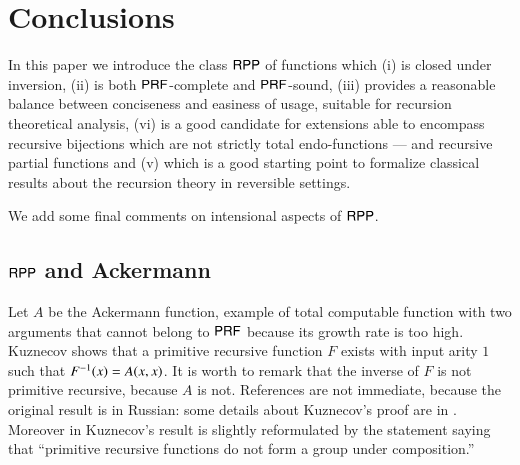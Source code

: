 \section{Conclusions}
\label{section:Some recursion theoretic side effects of RPP}

In this paper we introduce the class $\mathsf{RPP}$ of functions which
(i) is closed under inversion,
(ii) is both $ \mathsf{P}\mathsf{RF} $-complete and $ \mathsf{P}\mathsf{RF} $-sound,
(iii) provides a reasonable balance between conciseness and easiness of usage, suitable for recursion theoretical analysis,
(vi) is a good candidate for extensions able to encompass recursive bijections  which are not strictly total endo-functions 
--- and recursive partial functions	and 
(v) which is a good starting point to formalize classical results about the recursion theory in reversible settings.


We add some final comments on intensional aspects of $ \mathsf{RPP} $.

\subsection{$ \mathsf{RPP} $ and Ackermann}
Let $ A $ be the Ackermann function, example of total computable function with two arguments 
that cannot belong to $ \mathsf{P}\mathsf{RF} $ because its growth rate is too high. 
 Kuznecov shows that a primitive recursive  function $ F $ exists with input arity $ 1 $ such that $ {F}^{-1}(x) = A(x,x) $.
It is worth to remark that the inverse of $F$ is not primitive recursive, because $A$ is not.
References are not immediate, because the original result \cite{kuznecov50sssr} is in Russian:
some details about Kuznecov's proof are in .
Moreover in \cite[Exercise 5.7, p.25]{soare1987book} Kuznecov's result is slightly reformulated
by the statement saying that 
``primitive recursive functions do not form a group under composition.''

